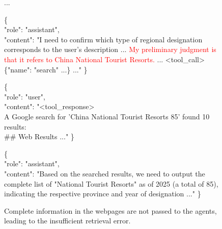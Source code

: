 \documentclass[11pt, letterpaper, logo, onecolumn, copyright, numbering]{paper_improved}
\begin{document}
\begin{figure}[htbp]
    \begin{tcolorbox}[title=Multi-turn Converation of WebSailor (GPT-5), colback=green!12]
    ...
    \begin{tcolorbox}[colback=green!6,colframe=green!30,boxrule=0.3pt,arc=0.6mm,sharp corners, left=1.5mm,right=1.5mm,top=1mm,bottom=1mm,breakable]
              \ttfamily\footnotesize
                \{\\
                    \hspace*{15pt}"role": "assistant",\\
                    \hspace*{15pt}"content": "I need to confirm which type of regional designation corresponds to the user's description ... \textcolor{red}{My preliminary judgment is that it refers to China National Tourist Resorts.} ... <tool\_call>\{"name": "search" ...\} ..."
              \}
        \end{tcolorbox}
    \begin{tcolorbox}[colback=green!6,colframe=green!30,boxrule=0.3pt,arc=0.6mm,sharp corners, left=1.5mm,right=1.5mm,top=1mm,bottom=1mm,breakable]
              \ttfamily\footnotesize
                \{\\
                    \hspace*{15pt}"role": "user",\\
                    \hspace*{15pt}"content": "<tool\_response>\\A Google search for 'China National Tourist Resorts 85' found 10 results:\\\#\# Web Results ..."
              \}
        \end{tcolorbox}
        \begin{tcolorbox}[colback=green!6,colframe=green!30,boxrule=0.3pt,arc=0.6mm,sharp corners, left=1.5mm,right=1.5mm,top=1mm,bottom=1mm,breakable]
              \ttfamily\footnotesize
                \{\\
                    \hspace*{15pt}"role": "assistant",\\
                    \hspace*{15pt}"content": "Based on the searched results, we need to output the complete list of "National Tourist Resorts" as of 2025 (a total of 85), indicating the respective province and year of designation ..."
              \}
        \end{tcolorbox}
    \end{tcolorbox}

\caption{Complete information in the webpages are not passed to the agents, leading to the insufficient retrieval error.}
\label{fig:case_insufficient_retrieval}
\end{figure}

\end{document}
